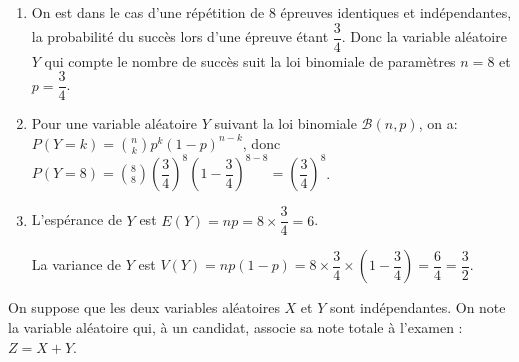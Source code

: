 \documentclass[10pt]{article}
\providecommand{\ds}{\displaystyle}
\begin{document}
\begin{enumerate}
\item
On est dans le cas d'une répétition de 8 épreuves identiques et indépendantes, la probabilité du succès lors d'une épreuve étant $\dfrac{3}{4}$. Donc la variable aléatoire $Y$ qui compte le nombre de succès suit la loi binomiale de paramètres $n=8$ et $p=\dfrac{3}{4}$.

\item 
Pour une variable aléatoire $Y$ suivant la loi binomiale $\mathcal{B}(n,p)$, on a:\\
$P(Y=k)=\ds\binom{n}{k} p^k \left (1-p\right )^{n-k}$, 
donc $P(Y=8)=\ds\binom{8}{8} \left (\dfrac{3}{4}\right )^{8}\left (1-\dfrac{3}{4}\right )^{8-8}
= \left (\dfrac{3}{4}\right )^8$.

\item L'espérance de $Y$ est $E(Y)= np = 8\times \dfrac{3}{4}= 6$.

La variance de $Y$ est $V(Y)= np(1 - p) = 8\times \dfrac{3}{4}\times \left (1 - \dfrac{3}{4}\right )=\dfrac{6}{4}= \dfrac{3}{2}$.
\end{enumerate}

\medskip


\medskip



On suppose que les deux variables aléatoires $X$ et $Y$ sont indépendantes. On note la variable aléatoire qui, à un candidat, associe sa note totale à l'examen : $Z = X + Y$.
\end{document}

